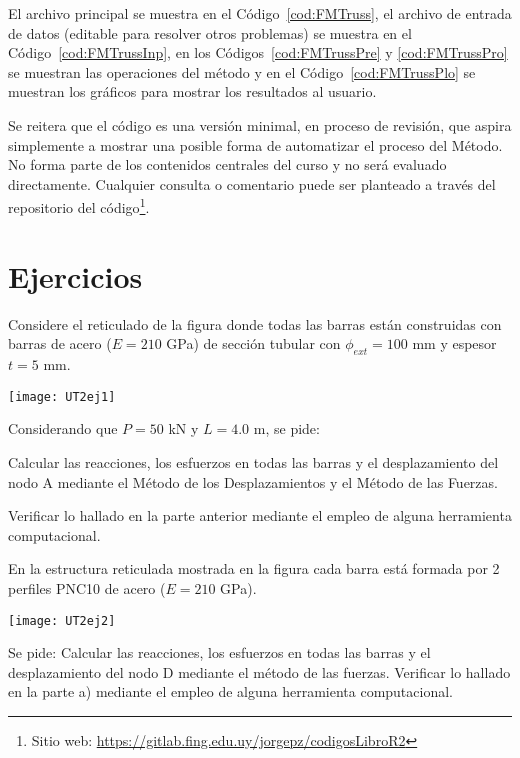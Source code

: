 El archivo principal se muestra en el Código~\ref{cod:FMTruss}, el archivo de entrada de datos (editable para resolver otros problemas) se muestra en el Código~\ref{cod:FMTrussInp}, en los Códigos~\ref{cod:FMTrussPre} y \ref{cod:FMTrussPro} se muestran las operaciones del método y en el Código~\ref{cod:FMTrussPlo} se muestran los gráficos para mostrar los resultados al usuario.

Se reitera que el código es una versión minimal, en proceso de revisión, que aspira simplemente a mostrar una posible forma de automatizar el proceso del Método. %
%
No forma parte de los contenidos centrales del curso y no será evaluado directamente. %
%
Cualquier consulta o comentario puede ser planteado a través del repositorio del código\footnote{Sitio web: \href{https://gitlab.fing.edu.uy/jorgepz/codigosLibroR2
}{https://gitlab.fing.edu.uy/jorgepz/codigosLibroR2}}. %


\newpage
\section{Ejercicios}
\setcounter{ejercicio}{0}

\ejercicio


Considere el reticulado de la figura donde todas las barras están construidas con barras de acero ($E=210$ GPa) de sección tubular con $\phi_{ext} =100$ mm y espesor $t=5$ mm. 

\begin{center}
\texttt{[image: UT2ej1]}
\end{center}

Considerando que $P=50$ kN y $L=4.0$ m, se pide:

\parte Calcular las reacciones, los esfuerzos en todas las barras y el desplazamiento del nodo A mediante el Método de los Desplazamientos y el Método de las Fuerzas.

\parte Verificar lo hallado en la parte anterior mediante el empleo de alguna herramienta computacional.




\ejercicio

En la estructura reticulada mostrada en la figura cada barra está formada por 2 perfiles PNC10 de acero ($E=210$ GPa).

\begin{center}
	\texttt{[image: UT2ej2]}
\end{center}

Se pide:
%
\parte Calcular las reacciones, los esfuerzos en todas las barras y el desplazamiento del nodo D mediante el método de las fuerzas.
%
\parte Verificar lo hallado en la parte a) mediante el empleo de alguna herramienta computacional.




